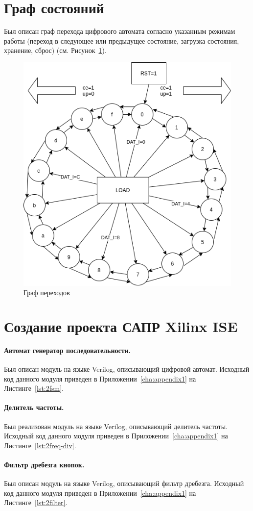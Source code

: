 \section{Граф состояний}
Был описан граф перехода цифрового автомата согласно указанным режимам работы (переход в следующее или предыдущее состояние, загрузка состояния, хранение, сброс) (см. Рисунок~\ref{fig:graph}).
\begin{figure}[h!]
	\centering
	\includegraphics[width=0.4\linewidth]{course-plis/images/lab2/graph}
	\caption{Граф переходов}
	\label{fig:graph}
\end{figure}

\newpage
\section{Создание проекта САПР Xilinx ISE}

\paragraph{Автомат генератор последовательности.}
Был описан модуль на языке Verilog, описывающий цифровой автомат. 
Исходный код данного модуля приведен в Приложении~\ref{cha:appendix1} на Листинге~\ref{lst:2fsm}.
\paragraph{Делитель частоты.}
Был реализован модуль на языке Verilog, описывающий делитель частоты.
Исходный код данного модуля приведен в Приложении~\ref{cha:appendix1} на Листинге~\ref{lst:2freq-div}.

\paragraph{Фильтр дребезга кнопок.}
Был описан модуль на языке Verilog, описывающий фильтр дребезга.
Исходный код данного модуля приведен в Приложении~\ref{cha:appendix1} на Листинге~\ref{lst:2filter}.

